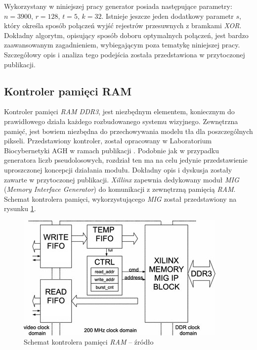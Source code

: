 Wykorzystany w niniejszej pracy generator posiada następujące parametry: $n=3900$, $r=128$, $t=5$, $k=32$. Istnieje jeszcze jeden dodatkowy parametr $s$, który określa sposób połączeń wyjść rejestrów przesuwnych z bramkami \textit{XOR}. Dokładny algorytm, opisujący sposób doboru optymalnych połączeń, jest bardzo zaawansowanym zagadnieniem, wybiegającym poza tematykę niniejszej pracy. Szczegółowy opis i analiza tego podejścia została przedstawiona w przytoczonej publikacji.

\subsection{Kontroler pamięci RAM}
\label{subsec:fpga_ram_kontroler}

Kontroler pamięci \textit{RAM DDR3}, jest niezbędnym elementem, koniecznym do prawidłowego działa każdego rozbudowanego systemu wizyjnego. Zewnętrzna pamięć, jest bowiem niezbędna do przechowywania modelu tła dla poszczególnych pikseli. Przedstawiony kontroler, został opracowany w Laboratorium Biocybernetyki AGH w ramach publikacji \cite{kryjak_14_hd_fpga}. Podobnie jak w przypadku generatora liczb pseudolosowych, rozdział ten ma na celu jedynie przedstawienie uproszczonej koncepcji działania modułu. Dokładny opis i dyskusja zostały zawarte w przytoczonej publikacji. \textit{Xillinx} zapewnia dedykowany moduł \textit{MIG} (\textit{Memory Interface Generator}) do komunikacji z zewnętrzną pamięcią \textit{RAM}. Schemat kontrolera pamięci, wykorzystującego \textit{MIG} został przedstawiony na rysunku \ref{fig:ram_ctrl}. 

	\begin{figure}[h!]
		\centering
		\includegraphics[scale=0.9]{img/4/ram_ctrl_scheme.jpg}
		\caption{Schemat kontrolera pamięci \textit{RAM} -- źródło \cite{kryjak_14_hd_fpga}}
		\label{fig:ram_ctrl}
	\end{figure}

